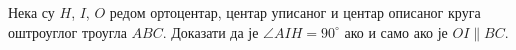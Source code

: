 \problem
Нека су $H$, $I$, $O$ редом ортоцентар, центар уписаног и центар описаног круга
оштроуглог троугла $ABC$.
Доказати да је
\linebreak[1]
$\angle AIH = 90^\circ$ ако и само ако је $OI \parallel BC$.

\solution
\endproblem
